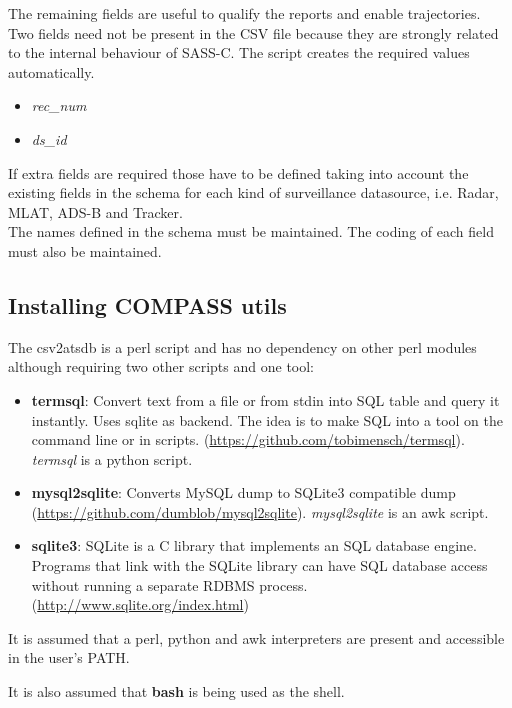 The remaining fields are useful to qualify the reports and enable trajectories. \\

\newpage
Two fields need not be present in the CSV file because they are strongly related to the internal behaviour of SASS-C. The script creates the required values automatically.
\begin{itemize}
\item \textit{rec\_num}
\item \textit{ds\_id}
\\
\end{itemize}

If extra fields are required those have to be defined taking into account the existing fields in the schema for each kind of surveillance datasource, i.e. Radar, MLAT, ADS-B and Tracker. \\

The names defined in the schema must be maintained. The coding of each field must also be maintained.

\subsection{Installing COMPASS utils}

The csv2atsdb is a perl script and has no dependency on other perl modules although requiring two other scripts and one tool:
\begin{itemize}
\item \textbf{termsql}: Convert text from a file or from stdin into SQL table and query it instantly. Uses sqlite as backend. The idea is to make SQL into a tool on the command line or in scripts. (\url{https://github.com/tobimensch/termsql}). \textit{termsql} is a python script.
\item \textbf{mysql2sqlite}: Converts MySQL dump to SQLite3 compatible dump (\url{https://github.com/dumblob/mysql2sqlite}). \textit{mysql2sqlite} is an awk script.
\item \textbf{sqlite3}: SQLite is a C library that implements an SQL database engine. Programs that link with the SQLite library can have SQL database access without running a separate RDBMS process. (\url{http://www.sqlite.org/index.html})
\\
\end{itemize}

It is assumed that a perl, python and awk interpreters are present and accessible in the user's PATH.

It is also assumed that \textbf{bash} is being used as the shell. \\

